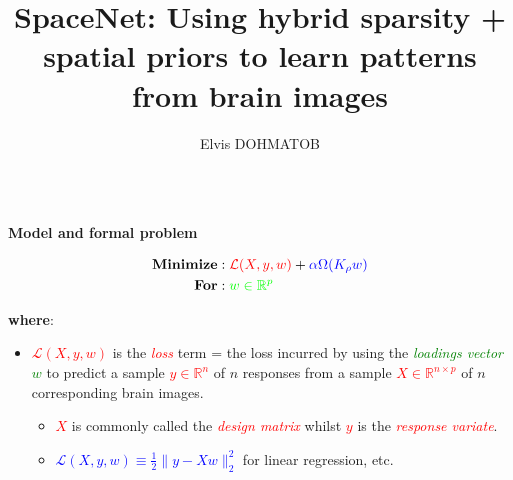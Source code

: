 \documentclass[french]{STIC_poster}
\title{SpaceNet: Using hybrid sparsity + spatial priors to learn patterns from brain images}			%
\author{Elvis DOHMATOB}						%
\begin{document}
	\begin{frame}[t]
		\begin{columns}[t]
			\hfill
			\begin{column}{.48\linewidth}
				\begin{sxbox}[\textwidth]{\textbf{Model and formal problem}}
                                  \begin{notitlebox}[\textwidth]
                                    \begin{equation}
                                      \begin{split}
                                        \textbf{Minimize} &: \textcolor{red}{\mathcal{L}(X,y,w)} + \textcolor{blue}{\alpha \Omega(K_{\rho}w)}\\
                                        \textbf{For} &: \textcolor{green}{w\in\mathbb{R}^p}
                                        \label{eq:opt_pb}
                                      \end{split}
                                    \end{equation}
                                  \end{notitlebox}
                                  \textbf{where}:
                                  \begin{itemize}
                                    \item \textcolor{red}{$\mathcal{L}(X,y,w)$} is the \textcolor{red}{\textit{loss}} term = the loss incurred by using the
                                      \textcolor{green}{\textit{loadings vector} $w$} to predict a sample \textcolor{red}{$y\in\mathbb{R}^n$} of $n$
                                      responses from a sample \textcolor{red}{$X\in\mathbb{R}^{n \times p}$} of $n$ corresponding brain images.
                                      \begin{itemize}
                                        \item \textcolor{red}{$X$} is commonly called the \textcolor{red}{\textit{design matrix}} whilst \textcolor{red}{$y$}
                                          is the \textcolor{red}{\textit{response variate}}. \item \textcolor{blue}{$\mathcal{L}(X,y,w) \equiv \frac{1}{2}\|y-Xw\|_2^2$} for linear regression, etc.

\end{itemize}
\end{itemize}
\end{sxbox}
\end{column}
\end{columns}
\end{frame}
\end{document}
